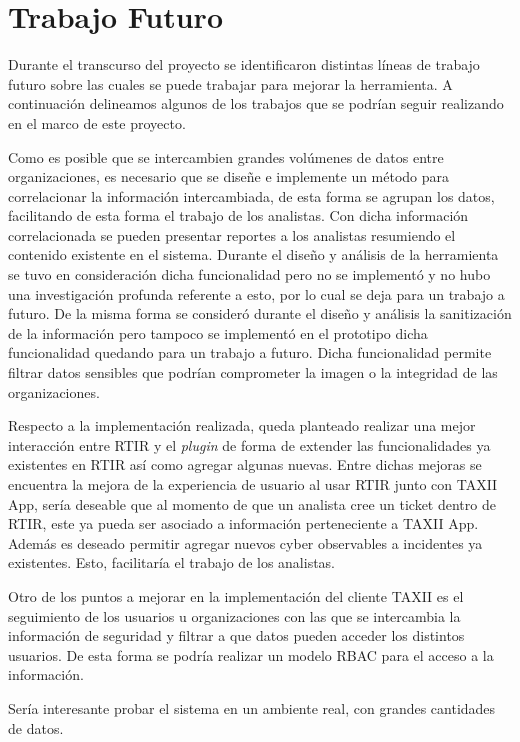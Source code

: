 \section{Trabajo Futuro}
Durante el transcurso del proyecto se identificaron distintas líneas de trabajo futuro sobre las cuales se puede trabajar para mejorar la herramienta. A continuación delineamos algunos de los trabajos que se podrían seguir realizando en el marco de este proyecto.
\bigskip

Como es posible que se intercambien grandes volúmenes de datos entre organizaciones, es necesario que se diseñe e implemente un método para correlacionar la información intercambiada, de esta forma se agrupan los datos, facilitando de esta forma el trabajo de los analistas. Con dicha información correlacionada se pueden presentar reportes a los analistas resumiendo el contenido existente en el sistema. Durante el diseño y análisis de la herramienta se tuvo en consideración dicha funcionalidad pero no se implementó y no hubo una investigación profunda referente a esto, por lo cual se deja para un trabajo a futuro. 
De la misma forma se consideró durante el diseño y análisis la sanitización de la información pero tampoco se implementó en el prototipo dicha funcionalidad quedando para un trabajo a futuro.  Dicha funcionalidad permite filtrar datos sensibles que podrían comprometer la imagen o la integridad de las organizaciones.
\bigskip

Respecto a la implementación realizada, queda planteado realizar una mejor interacción entre RTIR y el \textit{plugin} de forma de extender las funcionalidades ya existentes en RTIR así como agregar algunas nuevas. Entre dichas mejoras se encuentra la mejora de la experiencia de usuario al usar RTIR junto con TAXII App, sería deseable que al momento de que un analista cree un ticket dentro de RTIR, este ya pueda ser asociado a información perteneciente a TAXII App. Además es deseado permitir agregar nuevos cyber observables a incidentes ya existentes. Esto, facilitaría el trabajo de los analistas.

\bigskip

Otro de los puntos a mejorar en la implementación del cliente TAXII es el seguimiento de los usuarios u organizaciones con las que se intercambia la información de seguridad y filtrar a que datos pueden acceder los distintos usuarios. De esta forma se podría realizar un modelo RBAC para el acceso a la información.
\bigskip

Sería interesante probar el sistema en un ambiente real, con grandes cantidades de datos.
